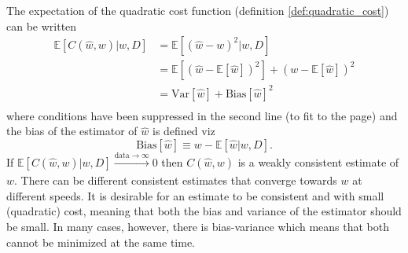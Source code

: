 \begin{theorem}
	\label{theorem:MSE}
	The expectation of the quadratic cost function (definition \eqref{def:quadratic_cost}) can be written
	\begin{equation}
		\begin{split}
			\mathbb{E}[C(\hat{w}, w)|w,D] &= \mathbb{E}[(\hat{w}-w)^2|w,D]\\ 
			&= \mathbb{E}[(\hat{w}-\mathbb{E}[\hat{w}])^2]+(w-\mathbb{E}[\hat{w}])^2\\
			&=\text{Var}[\hat{w}]+\text{Bias}[\hat{w}]^2\\
		\end{split}
		\label{eq:MSE}
	\end{equation}
	where conditions have been suppressed in the second line (to fit to the page) and the bias of the estimator of $\hat{w}$ is defined viz
	\begin{equation}
		\text{Bias}[\hat{w}]\equiv w-\mathbb{E}[\hat{w}|w,D].
	\end{equation}
	If $\mathbb{E}[C(\hat{w}, w)|w,D]\xrightarrow[]{\text{data}\rightarrow\infty} 0$ then $C(\hat{w}, w)$ is a weakly consistent estimate of $w$. There can be different consistent estimates that converge towards $w$ at different speeds. It is desirable for an estimate to be consistent and with small (quadratic) cost, meaning that both the bias and variance of the estimator should be small. In many cases, however, there is bias-variance which means that both cannot be minimized at the same time. 
\end{theorem}

